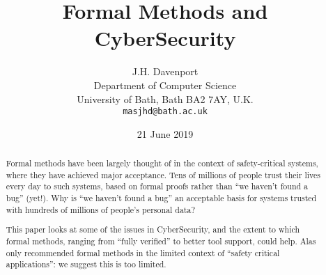 \documentclass{eptcs}
\begin{document}
\author{J.H. Davenport\\Department of Computer Science\\University of Bath, Bath BA2 7AY, U.K.\\\tt masjhd@bath.ac.uk}
\title{Formal Methods and CyberSecurity}
\date{21 June 2019}\def\authorrunning{J.H. Davenport}
\def\titlerunning{Formal Methods and CyberSecurity}
\maketitle
\begin{abstract}
Formal methods have been largely thought of in the context of safety-critical systems, where they have achieved major acceptance. Tens of millions of people trust their lives every day to such systems, based on formal proofs rather than ``we haven't found a bug'' (yet!). Why is ``we haven't found a bug'' an acceptable basis for systems trusted with hundreds of millions of people's personal data?

This paper looks at some of the issues in CyberSecurity, and the extent to which formal methods, ranging from ``fully verified'' to better tool support, could help. Alas \cite{RoyalSociety2016a} only recommended formal methods in the limited context of ``safety critical applications'': we suggest this is too limited.
\end{abstract}
\end{document}
